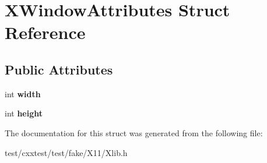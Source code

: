 \hypertarget{structXWindowAttributes}{\section{X\-Window\-Attributes Struct Reference}
\label{structXWindowAttributes}
}
\subsection*{Public Attributes}
\begin{DoxyCompactItemize}
\item 
\hypertarget{structXWindowAttributes_a91f82bf8c5f24831d54f0e8f925456b5}{int {\bfseries width}}\label{structXWindowAttributes_a91f82bf8c5f24831d54f0e8f925456b5}

\item 
\hypertarget{structXWindowAttributes_a44a3c09222cdb8a1cedd41c7731e581a}{int {\bfseries height}}\label{structXWindowAttributes_a44a3c09222cdb8a1cedd41c7731e581a}

\end{DoxyCompactItemize}


The documentation for this struct was generated from the following file\-:\begin{DoxyCompactItemize}
\item 
test/cxxtest/test/fake/\-X11/Xlib.\-h\end{DoxyCompactItemize}

